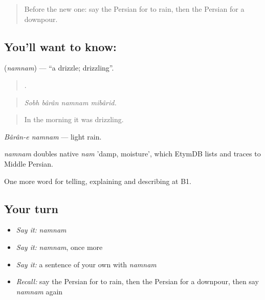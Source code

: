 \label{lesson:FA-C474-namnam}



\begin{quote}
Before the new one: say the Persian for to rain, then the Persian for a downpour.
\end{quote}

\subsection*{You'll want to know:  }
\textbf{ } (\emph{namnam}) — \textquotedblleft{}a drizzle; drizzling\textquotedblright{}.

\begin{quote}
    .
\end{quote}

\begin{quote}
\emph{Sobh bârân namnam mibârid.}
\end{quote}

\begin{quote}
In the morning it was drizzling.
\end{quote}

\emph{Bârân-e namnam} — light rain.

\begin{cousinweb}
\emph{namnam} doubles native \emph{nam} 'damp, moisture', which EtymDB lists and traces to Middle Persian.
\end{cousinweb}

\begin{grammarlens}[title={What you've built}]
One more word for telling, explaining and describing at B1.
\end{grammarlens}

\subsection*{Your turn}
\begin{itemize}
\raggedright
  \item \emph{Say it:} \emph{namnam}
  \item \emph{Say it:} \emph{namnam}, once more
  \item \emph{Say it:} a sentence of your own with \emph{namnam}
  \item \emph{Recall:} say the Persian for to rain, then the Persian for a downpour, then say \emph{namnam} again
\end{itemize}

